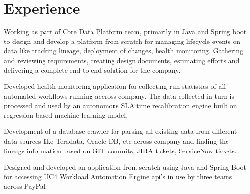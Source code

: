 \documentclass[]{kushal-resume}
\begin{document}
\hfill
\begin{minipage}[t]{0.66\textwidth}
	

\section{Experience}

\vspace{\topsep}
\begin{tightemize}\item Working as part of Core Data Platform team, primarily in Java  and Spring boot to design and develop a platform from scratch for managing lifecycle events on  data like tracking lineage, deployment of changes, health monitoring. 
Gathering and reviewing requirements, creating design documents, estimating efforts and delivering a complete end-to-end solution for the company.
\item Developed health monitoring application for collecting run statistics of all automated workflows running accross company.
The data collected in turn is processed and used by an autonomous SLA time recalibration engine built on regression based machine learning model.
\item Development of a database crawler for parsing all existing data from different data-sources like Teradata, Oracle DB, etc across company and finding the lineage information based on GIT commits, JIRA tickets, ServiceNow tickets.
\item Designed and developed an application from scratch using Java and Spring Boot for accessing UC4 Workload Automation Engine api's in use by three teams across PayPal.
\end{tightemize}
\sectionsep


\end{minipage}
\end{document}
